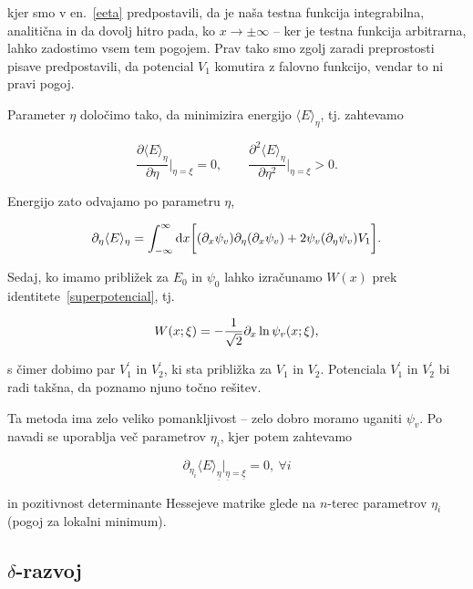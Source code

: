 \ni kjer smo v en.~\eqref{eeta} predpostavili, da je na\v sa testna funkcija integrabilna, analiti\v cna in da dovolj hitro pada, ko
$x \to \pm \infty$ -- ker je testna funkcija arbitrarna, lahko zadostimo vsem tem pogojem. Prav tako smo zgolj zaradi preprostosti
pisave predpostavili, da potencial $V_1$ komutira z falovno funkcijo, vendar to ni pravi pogoj.

Parameter $\eta$ dolo\v cimo tako, da minimizira energijo $\langle E \rangle_\eta$, tj. zahtevamo

\begin{equation}
	\frac{\partial \langle E \rangle_\eta}{\partial\eta}\bigg|_{\eta = \xi} = 0, \qquad
	\frac{\partial^2 \langle E \rangle_\eta}{\partial\eta^2}\bigg|_{\eta = \xi} > 0.
\end{equation}

\ni Energijo zato odvajamo po parametru $\eta$,

\begin{equation}
	\partial_\eta\langle E\rangle_\eta = \int_{-\infty}^\infty\text{d} x\bigg[(\partial_x \psi_v) \partial_\eta (\partial_x \psi_v) +  2 \psi_v (\partial_\eta \psi_v) V_1\bigg].
\end{equation}

\ni Sedaj, ko imamo pribli\v zek za $E_0$ in $\psi_0$ lahko izra\v cunamo $W(x)$ prek identitete~\eqref{superpotencial}, tj.

\begin{equation}
	W (x; \xi) = -\frac{1}{\sqrt{2}}\partial_x\ln\psi_v (x;\xi),
\end{equation}

\ni s \v cimer dobimo par $V_1^\prime$ in $V_2^\prime$, ki sta pribli\v zka za $V_1$ in $V_2$. Potenciala $V_1^\prime$ in $V_2^\prime$
bi radi tak\v sna, da poznamo njuno to\v cno re\v sitev.

Ta metoda ima zelo veliko pomankljivost -- zelo dobro moramo uganiti $\psi_v$. Po navadi se uporablja ve\v c parametrov $\eta_i$, kjer
potem zahtevamo

\begin{equation}
	\partial_{\eta_i} \langle E \rangle_{\underline\eta}\Big|_{\underline{\eta} = \underline{\xi}} = 0, \ \forall i
\end{equation}

\ni in pozitivnost determinante Hessejeve matrike glede na $n$-terec parametrov $\eta_i$ (pogoj za lokalni minimum).

\subsection{$\delta$-razvoj}

